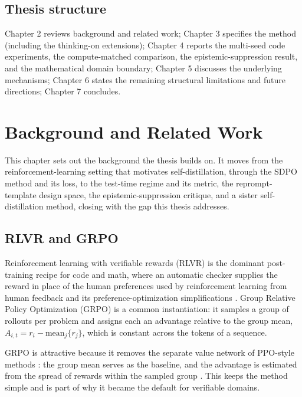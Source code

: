 \documentclass[12pt,a4paper]{report}
\begin{document}
\section{Thesis structure}\label{thesis-structure}

Chapter 2 reviews background and related work; Chapter 3 specifies the method (including the thinking-on extensions); Chapter 4 reports the multi-seed code experiments, the compute-matched comparison, the epistemic-suppression result, and the mathematical domain boundary; Chapter 5 discusses the underlying mechanisms; Chapter 6 states the remaining structural limitations and future directions; Chapter 7 concludes.
\chapter{Background and Related Work}\label{chapter-2-background-and-related-work}

This chapter sets out the background the thesis builds on. It moves from the reinforcement-learning setting that motivates self-distillation, through the SDPO method and its loss, to the test-time regime and its metric, the reprompt-template design space, the epistemic-suppression critique, and a sister self-distillation method, closing with the gap this thesis addresses.

\section{RLVR and GRPO}\label{rlvr-and-grpo}

Reinforcement learning with verifiable rewards (RLVR) is the dominant post-training recipe for code and math, where an automatic checker supplies the reward in place of the human preferences used by reinforcement learning from human feedback \cite{r15} and its preference-optimization simplifications \cite{r16}. Group Relative Policy Optimization (GRPO) \cite{r8} is a common instantiation: it samples a group of rollouts per problem and assigns each an advantage relative to the group mean, \(A_{i,t} = r_i - \text{mean}_j\{r_j\}\), which is constant across the tokens of a sequence.

GRPO is attractive because it removes the separate value network of PPO-style methods \cite{r14}: the group mean serves as the baseline, and the advantage is estimated from the spread of rewards within the sampled group \cite{r8}. This keeps the method simple and is part of why it became the default for verifiable domains.
\end{document}
